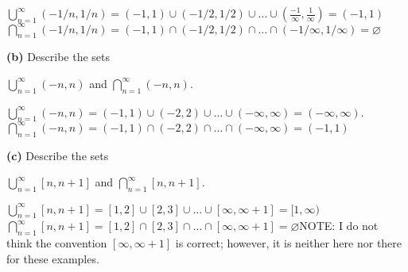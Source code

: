 \documentclass[12pt]{article}
\begin{document}
\begin{solution}
\newline$\displaystyle\bigcup_{n=1}^\infty(-1/n,1/n) = \textstyle(-1,1)\cup(-1/2,1/2)\cup\dots\cup(\frac{-1}{\infty},\frac{1}{\infty}) = (-1,1)$
\newline\newline\newline $\displaystyle\bigcap_{n=1}^\infty(-1/n,1/n) = (-1,1)\cap(-1/2,1/2)\cap\dots\cap(-1/\infty,1/\infty) = \varnothing$
\end{solution}
\begin{subproblem}\textbf{(b)}
Describe the sets\newline
\begin{center}
$\displaystyle\bigcup_{n=1}^\infty(-n,n)$ and $\displaystyle\bigcap_{n=1}^\infty(-n,n)$.
\end{center}
\end{subproblem}
\begin{solution}
\newline$\displaystyle\bigcup_{n=1}^\infty(-n,n)=(-1,1)\cup(-2,2)\cup\dots\cup(-\infty,\infty) = (-\infty,\infty)$.
\newline\newline\newline $\displaystyle\bigcap_{n=1}^\infty(-n,n)=(-1,1)\cap(-2,2)\cap\dots\cap(-\infty,\infty)=(-1,1)$
\end{solution}
\newpage
\begin{subproblem}\textbf{(c)}
Describe the sets\newline
\begin{center}
$\displaystyle\bigcup_{n=1}^\infty[n,n+1]$ and $\displaystyle\bigcap_{n=1}^\infty[n,n+1]$.
\end{center}
\end{subproblem}
\begin{solution}\newline
$\displaystyle\bigcup_{n=1}^\infty[n,n+1]=[1,2]\cup[2,3]\cup\dots\cup[\infty,\infty+1]=[1,\infty)$
\newline\newline\newline$\displaystyle\bigcap_{n=1}^\infty[n,n+1]=[1,2]\cap[2,3]\cap\dots\cap[\infty,\infty+1]=\varnothing
$\newline\newline NOTE: I do not think the convention $[\infty,\infty+1]$ is correct; however, it is neither here nor there for these examples.
\end{solution}
\end{document}
